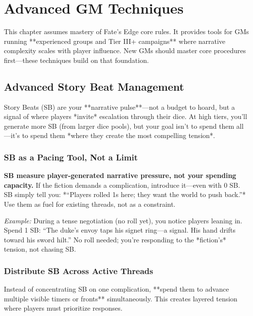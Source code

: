 \chapter{Advanced GM Techniques}
\label{ch:gm-advanced}

This chapter assumes mastery of Fate's Edge core rules. It provides tools for GMs running **experienced groups and Tier III+ campaigns** where narrative complexity scales with player influence. New GMs should master core procedures first---these techniques build on that foundation.

\section{Advanced Story Beat Management}

Story Beats (SB) are your **narrative pulse**---not a budget to hoard, but a signal of where players *invite* escalation through their dice. At high tiers, you'll generate more SB (from larger dice pools), but your goal isn't to spend them all---it's to spend them *where they create the most compelling tension*. 

\subsection*{SB as a Pacing Tool, Not a Limit}
\begin{tcolorbox}[
  colback=blue!5!white,
  colframe=blue!75!black,
  title=You Are Not Limited by SB,
  fonttitle=\bfseries
,breakable]
\textbf{SB measure player-generated narrative pressure, not your spending capacity.} If the fiction demands a complication, introduce it---even with 0 SB. SB simply tell you: *``Players rolled 1s here; they want the world to push back.''* Use them as fuel for existing threads, not as a constraint. 

\medskip
\noindent\textit{Example:} During a tense negotiation (no roll yet), you notice players leaning in. Spend 1 SB: ``The duke's envoy taps his signet ring---a signal. His hand drifts toward his sword hilt.'' No roll needed; you're responding to the *fiction's* tension, not chasing SB.
\end{tcolorbox}

\subsection*{Distribute SB Across Active Threads}
Instead of concentrating SB on one complication, **spend them to advance multiple visible timers or fronts** simultaneously. This creates layered tension where players must prioritize responses. 

